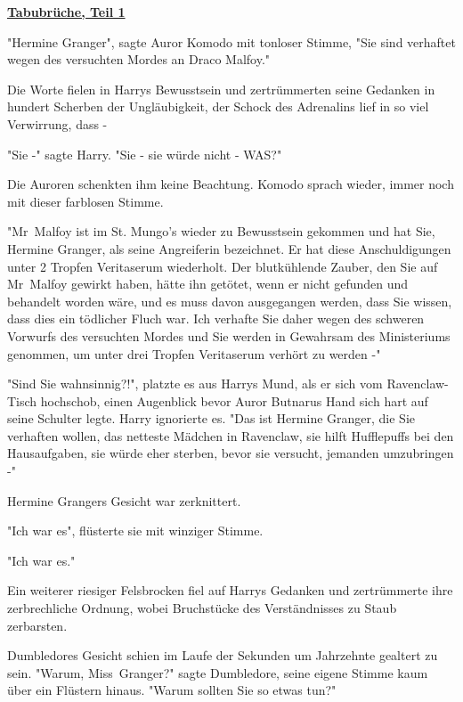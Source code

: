 

\hypertarget{tabubruxfcche-teil-1}{%

\textbf{\uline{Tabubrüche, Teil 1}}

"Hermine Granger", sagte Auror Komodo mit tonloser Stimme, "Sie sind verhaftet wegen des versuchten Mordes an Draco Malfoy."

Die Worte fielen in Harrys Bewusstsein und zertrümmerten seine Gedanken in hundert Scherben der Ungläubigkeit, der Schock des Adrenalins lief in so viel Verwirrung, dass -

"Sie -" sagte Harry. "Sie - sie würde nicht - WAS?"

Die Auroren schenkten ihm keine Beachtung. Komodo sprach wieder, immer noch mit dieser farblosen Stimme.

"Mr~Malfoy ist im St. Mungo's wieder zu Bewusstsein gekommen und hat Sie, Hermine Granger, als seine Angreiferin bezeichnet. Er hat diese Anschuldigungen unter 2 Tropfen Veritaserum wiederholt. Der blutkühlende Zauber, den Sie auf Mr~Malfoy gewirkt haben, hätte ihn getötet, wenn er nicht gefunden und behandelt worden wäre, und es muss davon ausgegangen werden, dass Sie wissen, dass dies ein tödlicher Fluch war. Ich verhafte Sie daher wegen des schweren Vorwurfs des versuchten Mordes und Sie werden in Gewahrsam des Ministeriums genommen, um unter drei Tropfen Veritaserum verhört zu werden -"

"Sind Sie wahnsinnig?!", platzte es aus Harrys Mund, als er sich vom Ravenclaw-Tisch hochschob, einen Augenblick bevor Auror Butnarus Hand sich hart auf seine Schulter legte. Harry ignorierte es. "Das ist Hermine Granger, die Sie verhaften wollen, das netteste Mädchen in Ravenclaw, sie hilft Hufflepuffs bei den Hausaufgaben, sie würde eher sterben, bevor sie versucht, jemanden umzubringen -"

Hermine Grangers Gesicht war zerknittert.

"Ich war es", flüsterte sie mit winziger Stimme.

"Ich war es."

Ein weiterer riesiger Felsbrocken fiel auf Harrys Gedanken und zertrümmerte ihre zerbrechliche Ordnung, wobei Bruchstücke des Verständnisses zu Staub zerbarsten.

Dumbledores Gesicht schien im Laufe der Sekunden um Jahrzehnte gealtert zu sein. "Warum, Miss~Granger?" sagte Dumbledore, seine eigene Stimme kaum über ein Flüstern hinaus. "Warum sollten Sie so etwas tun?"

}
